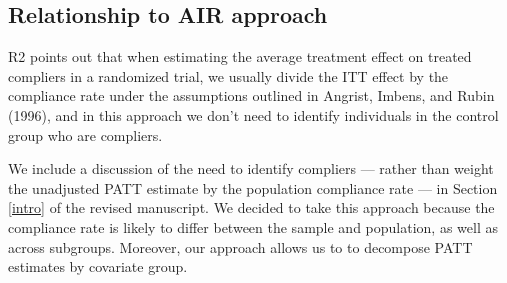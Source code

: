 \documentclass[hidelinks,12pt,letterpaper]{article}
\begin{document}

\subsection{Relationship to AIR approach}\label{reweighting}

R2 points out that when estimating the average treatment effect on treated compliers in a randomized trial, we usually divide the ITT effect by the compliance rate under the assumptions outlined in Angrist, Imbens, and Rubin (1996), and in this approach we don't need to identify individuals in the control group who are compliers.

We include a discussion of the need to identify compliers --- rather than weight the unadjusted PATT estimate by the population compliance rate --- in Section \ref{intro} of the revised manuscript. We decided to take this approach because the compliance rate is likely to differ between the sample and population, as well as across subgroups. Moreover, our approach allows us to to decompose PATT estimates by covariate group. 
\end{document}
